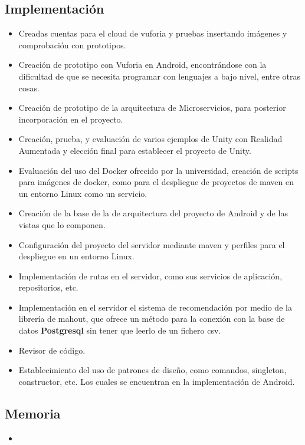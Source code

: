     \subsection{Implementación}
    \label{makereference7.4.3}
        \begin{itemize}  
            \item Creadas cuentas para el cloud de vuforia y pruebas insertando imágenes y comprobación con prototipos.
            \item Creación de prototipo con Vuforia en Android, encontrándose con la dificultad de que se necesita programar con lenguajes a bajo nivel, entre otras cosas.
            \item Creación de prototipo de la arquitectura de Microservicios, para posterior incorporación en el proyecto.
            \item Creación, prueba, y evaluación de varios ejemplos de Unity con Realidad Aumentada y elección final para establecer el proyecto de Unity.
            \item Evaluación del uso del Docker ofrecido por la universidad, creación de scripts para imágenes de docker, como para el despliegue de proyectos de maven en un entorno Linux como un servicio. 
            \item Creación de la base de la de arquitectura del proyecto de Android y de las vistas que lo componen.
            \item Configuración del proyecto del servidor mediante maven y perfiles para el despliegue en un entorno Linux.
            \item Implementación de rutas en el servidor, como sus servicios de aplicación, repositorios, etc.
            \item Implementación en el servidor el sistema de recomendación por medio de la librería de mahout, que ofrece un método para la conexión con la base de datos \textbf{Postgresql} sin tener que leerlo de un fichero csv.
            \item Revisor de código.
            \item Establecimiento del uso de patrones de diseño, como comandos, singleton, constructor, etc. Los cuales se encuentran en la implementación de Android. 
        \end{itemize}
    \subsection{Memoria}
    \label{makereference7.4.3}
        \begin{itemize}
            \item
        \end{itemize}
